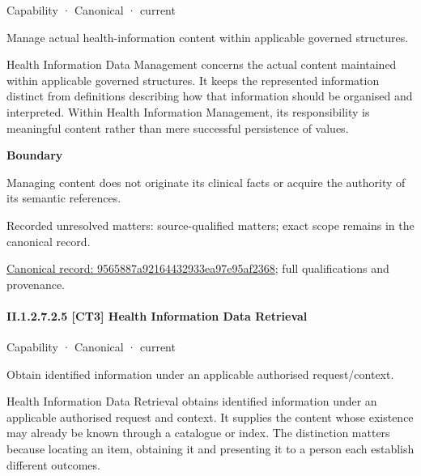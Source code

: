 \label{element:9565887a92164432933ea97e95af2368}
{\small Capability · Canonical · current}\par

Manage actual health-information content within applicable governed structures.



Health Information Data Management concerns the actual content maintained within applicable governed structures. It keeps the represented information distinct from definitions describing how that information should be organised and interpreted. Within Health Information Management, its responsibility is meaningful content rather than mere successful persistence of values.



\textbf{Boundary}



Managing content does not originate its clinical facts or acquire the authority of its semantic references.


{\small Recorded unresolved matters: source-qualified matters; exact scope remains in the canonical record.}\par
{\footnotesize \href{../../../../continuum/strategy/capability/9565887a92164432933ea97e95af2368.md}{Canonical record: 9565887a92164432933ea97e95af2368}; full qualifications and provenance.}\par
\paragraph*{II.1.2.7.2.5 [CT3] Health Information Data Retrieval}
\label{navigation:II.1.2.7.2.5}

\label{element:082760fc4804489a81eaed3e4fd9daa9}
{\small Capability · Canonical · current}\par

Obtain identified information under an applicable authorised request/context.



Health Information Data Retrieval obtains identified information under an applicable authorised request and context. It supplies the content whose existence may already be known through a catalogue or index. The distinction matters because locating an item, obtaining it and presenting it to a person each establish different outcomes.



